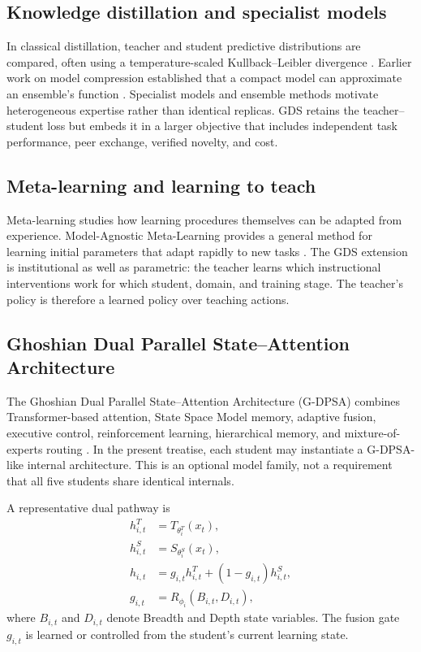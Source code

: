 \documentclass[11pt,a4paper]{article}
\begin{document}
\subsection{Knowledge distillation and specialist models}

In classical distillation, teacher and student predictive distributions are compared, often using a temperature-scaled Kullback--Leibler divergence \cite{hinton2015}. Earlier work on model compression established that a compact model can approximate an ensemble's function \cite{bucilua2006}. Specialist models and ensemble methods motivate heterogeneous expertise rather than identical replicas. GDS retains the teacher--student loss but embeds it in a larger objective that includes independent task performance, peer exchange, verified novelty, and cost.

\subsection{Meta-learning and learning to teach}

Meta-learning studies how learning procedures themselves can be adapted from experience. Model-Agnostic Meta-Learning provides a general method for learning initial parameters that adapt rapidly to new tasks \cite{finn2017}. The GDS extension is institutional as well as parametric: the teacher learns which instructional interventions work for which student, domain, and training stage. The teacher's policy is therefore a learned policy over teaching actions.

\subsection{Ghoshian Dual Parallel State--Attention Architecture}

The Ghoshian Dual Parallel State--Attention Architecture (G-DPSA) combines Transformer-based attention, State Space Model memory, adaptive fusion, executive control, reinforcement learning, hierarchical memory, and mixture-of-experts routing \cite{ghosh2026gdpsa}. In the present treatise, each student may instantiate a G-DPSA-like internal architecture. This is an optional model family, not a requirement that all five students share identical internals.

A representative dual pathway is
\begin{align}
h_{i,t}^{T} &= T_{\theta_i^T}(x_t),\\
h_{i,t}^{S} &= S_{\theta_i^S}(x_t),\\
h_{i,t} &= g_{i,t}h_{i,t}^{T}+(1-g_{i,t})h_{i,t}^{S},\\
g_{i,t} &= R_{\phi_i}(B_{i,t},D_{i,t}),
\end{align}
where \(B_{i,t}\) and \(D_{i,t}\) denote Breadth and Depth state variables. The fusion gate \(g_{i,t}\) is learned or controlled from the student's current learning state.
\end{document}
